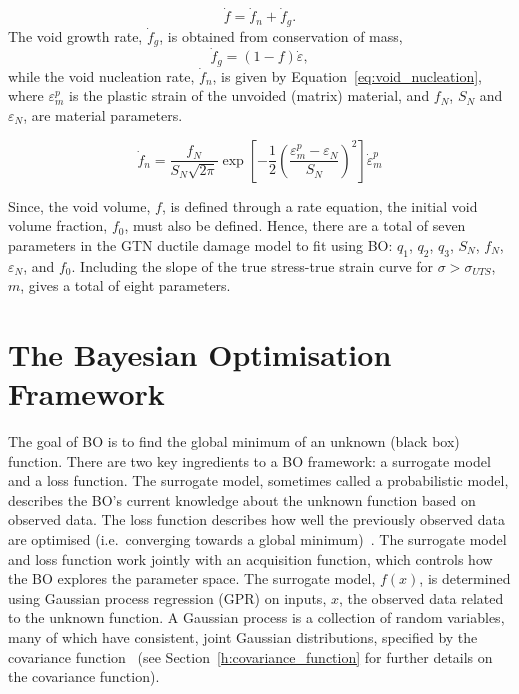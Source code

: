 \documentclass[preprint, review, 12pt]{elsarticle}
\begin{document}
	\begin{equation}
		\dot{f} = \dot{f}_n + \dot{f}_g.
		\label{eq:vvf}
	\end{equation}
	The void growth rate, $\dot{f}_g$, is obtained from conservation of mass,
	\begin{equation}
		\dot{f}_g = (1-f)\dot{\varepsilon},
		\label{eq:void_growth}
	\end{equation}
	while the void nucleation rate, $\dot{f}_n$, is given by Equation~\ref{eq:void_nucleation}, where $\varepsilon^p_m$ is the plastic strain of the unvoided (matrix) material, and $f_N$, $S_N$ and $\varepsilon_N$, are material parameters.

	\begin{equation}
		\dot{f}_n = \frac{f_N}{S_N \sqrt{2\pi}} \exp \left[ -\frac{1}{2} \left( \frac{{\varepsilon}_m^p -\varepsilon_N}{S_N} \right) ^ 2 \right] \dot{\varepsilon}_m^p
		\label{eq:void_nucleation}
	\end{equation}

	Since, the void volume, $f$, is defined through a rate equation, the initial void volume fraction, $f_0$, must also be defined.
	Hence, there are a total of seven parameters in the GTN ductile damage model to fit using BO: $q_1$, $q_2$, $q_3$, $S_N$, $f_N$, $\varepsilon_N$, and $f_0$.
	Including the slope of the true stress-true strain curve for $\sigma>\sigma_{UTS}$, $m$, gives a total of eight parameters.

	\section{The Bayesian Optimisation Framework}
	\label{h:general_bo}

	The goal of BO is to find the global minimum of an unknown (black box) function.
	There are two key ingredients to a BO framework: a surrogate model and a loss function.
	The surrogate model, sometimes called a probabilistic model, describes the BO's current knowledge about the unknown function based on observed data.
	The loss function describes how well the previously observed data are optimised (i.e.\ converging towards a global minimum)~\cite{SHAHRIARI2016}.
	The surrogate model and loss function work jointly with an acquisition function, which controls how the BO explores the parameter space.
	The surrogate model, $f(x)$, is determined using Gaussian process regression (GPR) on inputs, $x$, the observed data related to the unknown function.
	A Gaussian process is a collection of random variables, many of which have consistent, joint Gaussian distributions, specified by the covariance function~\cite{RASMUSSEN2004, RASMUSSEN2006} (see Section~\ref{h:covariance_function} for further details on the covariance function).
\end{document}
